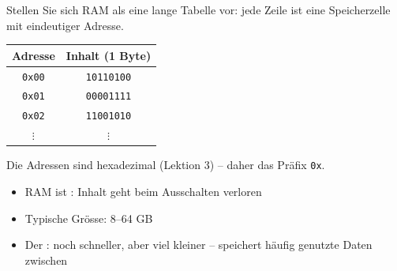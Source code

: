 \renewcommand{\thelektion}{L11 \textperiodcentered{} Aufbau eines Computers II}

\begin{frame}\end{frame}

\begin{frame}
\begin{center}
Stellen Sie sich RAM als eine lange Tabelle vor: jede Zeile ist eine Speicherzelle mit eindeutiger Adresse.
\end{center}
\begin{table}[H]
    \centering
    \begin{tabular}{c|c}
        \textbf{Adresse} & \textbf{Inhalt (1 Byte)} \\\midrule\midrule
        \texttt{0x00} & \texttt{10110100} \\\midrule
        \texttt{0x01} & \texttt{00001111} \\\midrule
        \texttt{0x02} & \texttt{11001010} \\\midrule
        $\vdots$ & $\vdots$ \\
    \end{tabular}
\end{table}
\begin{center}
Die Adressen sind hexadezimal (Lektion 3) -- daher das Präfix \texttt{0x}.
\end{center}
\end{frame}

\begin{frame}
\begin{itemize}\setlength\itemsep{7pt}
  \item RAM ist : Inhalt geht beim Ausschalten verloren
  \item Typische Grösse: 8--64 GB
  \item Der : noch schneller, aber viel kleiner -- speichert häufig genutzte Daten zwischen
\end{itemize}
\end{frame}


